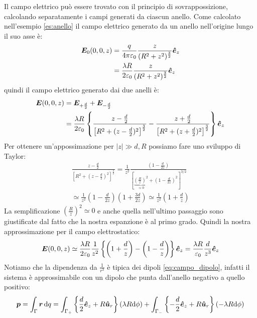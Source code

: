 \begin{Es}
Il campo elettrico può essere trovato con il principio di sovrappossizione, calcolando separatamente i campi generati da ciascun anello. Come calcolato nell'esempio \ref{es:anello} il campo elettrico generato da un anello nell'origine lungo il suo asse è:
\begin{align*}
 \boldsymbol{E}_0(0,0,z)&=\frac{q}{4\pi\varepsilon_0}\frac{z}{(R^2+z^2)^{\frac{3}{2}}}\boldsymbol{\hat {e}}_z\\
             &=\frac{\lambda R}{2\varepsilon_0}\frac{z}{(R^2+z^2)^{\frac{3}{2}}}\boldsymbol{\hat {e}}_z
\end{align*}
quindi il campo elettrico generato dai due anelli è:
\begin{align*}
 \boldsymbol{E}(0,0,z)&=\boldsymbol{E}_{+\frac{d}{2}}+\boldsymbol{E}_{-\frac{d}{2}}\\
               &=\frac{\lambda R}{2\varepsilon_0}\left\{
                  \frac{z-\frac{d}{2}}{\left[R^2+(z-\frac{d}{2})^2\right]^{\frac{3}{2}}}
                 -\frac{z+\frac{d}{2}}{\left[R^2+(z+\frac{d}{2})^2\right]^{\frac{3}{2}}}\right\}\boldsymbol{\hat {e}}_z
\end{align*}
Per ottenere un'appossimazione per $|z|\gg d,R$ possiamo fare uno sviluppo di Taylor:
\begin{multline*}
 \frac{z-\frac{d}{2}}{\left[R^2+(z-\frac{d}{2})^2\right]^{\frac{3}{2}}}
=\frac{1}{z^2}\frac{(1-\frac{d}{2z})}{\left[\underbrace{\left(\frac{R}{z}\right)^2}_{\simeq 0}+\left(1-\frac{d}{2z}\right)^2\right]^{3/2}}\\
\simeq\frac{1}{z^2}\left(1-\frac{d}{2z}\right)\left(1+\frac{3d}{2z}\right)
\simeq\frac{1}{z^2}\left(1+\frac{d}{z}\right)
\end{multline*}
La semplificazione $\left(\frac{R}{z}\right)^2\simeq 0$ e anche quella nell'ultimo passaggio sono giustificate dal fatto che la nostra espanzione è al primo grado. Quindi la nostra approssimazione per il campo elettrostatico:
\begin{equation*}
 \boldsymbol{E}(0,0,z) \simeq \frac{\lambda R}{2\varepsilon_0}\frac{1}{z^2}\left\{\left(1+\frac{d}{z}\right)-\left(1-\frac{d}{z}\right)\right\}\boldsymbol{\hat {e}}_z
 = \frac{\lambda R}{\varepsilon_0}\frac{d}{z^3}\boldsymbol{\hat {e}}_z
\end{equation*}
Notiamo che la dipendenza da $\frac{1}{r^3}$ è tipica dei dipoli \eqref{eq:campo_dipolo}, infatti il sistema è approssimabile con un dipolo che punta dall'anello negativo a quello positivo:
\begin{equation*}
 \ve p = \int_\Gamma \ve r\,\ud q = \int_{\Gamma_+} \left\{\frac{d}{2}\ver e_z+R\ver u_r\right\}\left(\lambda R\ud\phi\right) + \int_{\Gamma_-} \left\{-\frac{d}{2}\ver e_z+R\ver u_r\right\}\left(-\lambda R\ud\phi\right)

\end{equation*}
\end{Es}
